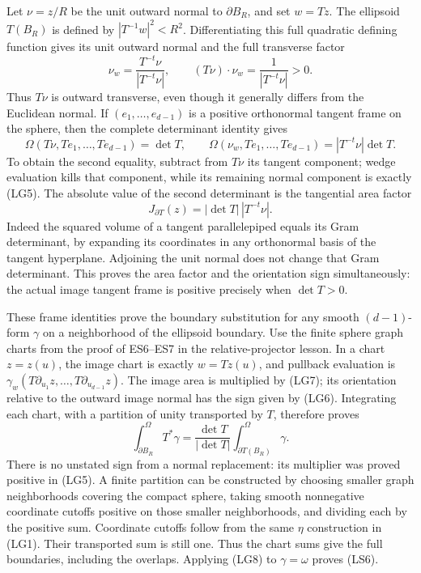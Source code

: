 \documentclass[
  11pt,
]{article}
\begin{document}
Let \(\nu=z/R\) be the unit outward normal to \(\partial B_R\), and set
\(w=Tz\). The ellipsoid \(T(B_R)\) is defined by \(|T^{-1}w|^2<R^2\).
Differentiating this full quadratic defining function gives its unit
outward normal and the full transverse factor \[
 \nu_w=\frac{T^{-t}\nu}{|T^{-t}\nu|},\qquad
 (T\nu)\cdot\nu_w=\frac1{|T^{-t}\nu|}>0.
 \tag{LG5}
\] Thus \(T\nu\) is outward transverse, even though it generally differs
from the Euclidean normal. If \((e_1,\ldots,e_{d-1})\) is a positive
orthonormal tangent frame on the sphere, then the complete determinant
identity gives \[
 \Omega(T\nu,Te_1,\ldots,Te_{d-1})=\det T,
 \qquad
 \Omega(\nu_w,Te_1,\ldots,Te_{d-1})
                      =|T^{-t}\nu|\det T.
 \tag{LG6}
\] To obtain the second equality, subtract from \(T\nu\) its tangent
component; wedge evaluation kills that component, while its remaining
normal component is exactly (LG5). The absolute value of the second
determinant is the tangential area factor \[
 J_{\partial T}(z)=|\det T|\,|T^{-t}\nu|.
 \tag{LG7}
\] Indeed the squared volume of a tangent parallelepiped equals its Gram
determinant, by expanding its coordinates in any orthonormal basis of
the tangent hyperplane. Adjoining the unit normal does not change that
Gram determinant. This proves the area factor and the orientation sign
simultaneously: the actual image tangent frame is positive precisely
when \(\det T>0\).

These frame identities prove the boundary substitution for any smooth
\((d-1)\)-form \(\gamma\) on a neighborhood of the ellipsoid boundary.
Use the finite sphere graph charts from the proof of ES6--ES7 in the
relative-projector lesson. In a chart \(z=z(u)\), the image chart is
exactly \(w=Tz(u)\), and pullback evaluation is
\(\gamma_w(T\partial_{u_1}z,\ldots,T\partial_{u_{d-1}}z)\). The image
area is multiplied by (LG7); its orientation relative to the outward
image normal has the sign given by (LG6). Integrating each chart, with a
partition of unity transported by \(T\), therefore proves \[
 \int_{\partial B_R}^{\Omega}T^*\gamma
       =\frac{\det T}{|\det T|}
           \int_{\partial T(B_R)}^{\Omega}\gamma.
 \tag{LG8}
\] There is no unstated sign from a normal replacement: its multiplier
was proved positive in (LG5). A finite partition can be constructed by
choosing smaller graph neighborhoods covering the compact sphere, taking
smooth nonnegative coordinate cutoffs positive on those smaller
neighborhoods, and dividing each by the positive sum. Coordinate cutoffs
follow from the same \(\eta\) construction in (LG1). Their transported
sum is still one. Thus the chart sums give the full boundaries,
including the overlaps. Applying (LG8) to \(\gamma=\omega\) proves
(LS6).
\end{document}
